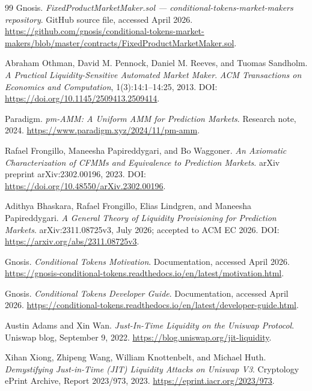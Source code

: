 \documentclass[10pt]{article}
\begin{document}
\begin{thebibliography}{99}
Gnosis.
\newblock \emph{FixedProductMarketMaker.sol --- conditional-tokens-market-makers repository}.
\newblock GitHub source file, accessed April 2026.
\newblock \url{https://github.com/gnosis/conditional-tokens-market-makers/blob/master/contracts/FixedProductMarketMaker.sol}.

Abraham Othman, David M. Pennock, Daniel M. Reeves, and Tuomas Sandholm.
\newblock \emph{A Practical Liquidity-Sensitive Automated Market Maker}.
\newblock \emph{ACM Transactions on Economics and Computation}, 1(3):14:1--14:25, 2013.
\newblock DOI: \url{https://doi.org/10.1145/2509413.2509414}.

Paradigm.
\newblock \emph{pm-AMM: A Uniform AMM for Prediction Markets}.
\newblock Research note, 2024.
\newblock \url{https://www.paradigm.xyz/2024/11/pm-amm}.

Rafael Frongillo, Maneesha Papireddygari, and Bo Waggoner.
\newblock \emph{An Axiomatic Characterization of CFMMs and Equivalence to Prediction Markets}.
\newblock arXiv preprint arXiv:2302.00196, 2023.
\newblock DOI: \url{https://doi.org/10.48550/arXiv.2302.00196}.

Adithya Bhaskara, Rafael Frongillo, Elias Lindgren, and Maneesha Papireddygari.
\newblock \emph{A General Theory of Liquidity Provisioning for Prediction Markets}.
\newblock arXiv:2311.08725v3, July 2026; accepted to ACM EC 2026.
\newblock DOI: \url{https://arxiv.org/abs/2311.08725v3}.

Gnosis.
\newblock \emph{Conditional Tokens Motivation}.
\newblock Documentation, accessed April 2026.
\newblock \url{https://gnosis-conditional-tokens.readthedocs.io/en/latest/motivation.html}.

Gnosis.
\newblock \emph{Conditional Tokens Developer Guide}.
\newblock Documentation, accessed April 2026.
\newblock \url{https://conditional-tokens.readthedocs.io/en/latest/developer-guide.html}.

Austin Adams and Xin Wan.
\newblock \emph{Just-In-Time Liquidity on the Uniswap Protocol}.
\newblock Uniswap blog, September 9, 2022.
\newblock \url{https://blog.uniswap.org/jit-liquidity}.

Xihan Xiong, Zhipeng Wang, William Knottenbelt, and Michael Huth.
\newblock \emph{Demystifying Just-in-Time (JIT) Liquidity Attacks on Uniswap V3}.
\newblock Cryptology ePrint Archive, Report 2023/973, 2023.
\newblock \url{https://eprint.iacr.org/2023/973}.

\end{thebibliography}
\end{document}
